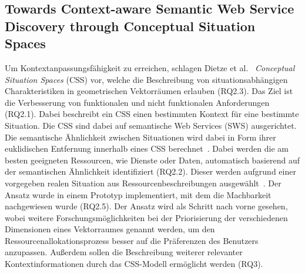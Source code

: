 \documentclass[conference,compsoc,ngerman]{IEEEtran}
\begin{document}
\subsection{Towards Context-aware Semantic Web Service Discovery through Conceptual Situation Spaces}
Um Kontextanpassungsfähigkeit zu erreichen, schlagen Dietze et al.~\cite{dietze2008towards} \textit{Conceptual Situation Spaces} (CSS) vor, welche die Beschreibung von situationsabhängigen Charakteristiken in geometrischen Vektorräumen erlauben (RQ2.3). Das Ziel ist die Verbesserung von funktionalen und nicht funktionalen Anforderungen (RQ2.1). Dabei beschreibt ein CSS einen bestimmten Kontext für eine bestimmte Situation. Die CSS sind dabei auf semantische Web Services (SWS) ausgerichtet. Die semantische Ähnlichkeit zwischen Situationen wird dabei in Form ihrer euklidischen Entfernung innerhalb eines CSS berechnet~\cite{dietze2008towards}. Dabei werden die am besten geeigneten Ressourcen, wie Dienste oder Daten, automatisch basierend auf der semantischen Ähnlichkeit identifiziert (RQ2.2). Dieser werden aufgrund einer vorgegeben realen Situation aus Ressourcenbeschreibungen ausgewählt~\cite{dietze2008towards}.
Der Ansatz wurde in einem Prototyp implementiert, mit dem die Machbarkeit nachgewiesen wurde (RQ2.5).
Der Ansatz wird als Schritt nach vorne gesehen, wobei weitere Forschungsmöglichkeiten bei der Priorisierung der verschiedenen Dimensionen eines Vektorraumes genannt werden, um den Ressourcenallokationsprozess besser auf die Präferenzen des Benutzers anzupassen. Außerdem sollen die Beschreibung weiterer relevanter Kontextinformationen durch das CSS-Modell ermöglicht werden (RQ3).
\end{document}
